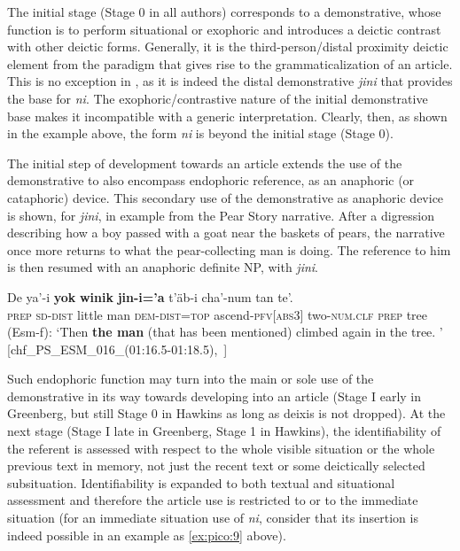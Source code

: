 \documentclass[output=paper
,modfonts
,nonflat]{langsci/langscibook}
\begin{document}
The initial stage (Stage 0 in all authors) corresponds to a demonstrative, whose function is to perform situational or exophoric  and introduces a deictic contrast with other deictic forms. Generally, it is the third-person/distal proximity deictic element from the paradigm that gives rise to the grammaticalization of an article. This is no exception in , as it is indeed the distal demonstrative \textit{jini} that provides the base for \textit{ni}.
The exophoric/contrastive nature of the initial demonstrative base makes it incompatible with a generic interpretation. Clearly, then, as shown in the example  above, the form \textit{ni} is beyond the initial stage (Stage 0).

The initial step of development towards an article extends the use of the demonstrative to also encompass endophoric reference, as an anaphoric (or cataphoric) device.  
This secondary use of the demonstrative as anaphoric device is shown, for  \textit{jini}, in example  from the Pear Story narrative. After a digression describing how a boy passed with a goat near the baskets of pears, the narrative once more returns to what the pear-collecting man is doing. The reference to him is then resumed with an anaphoric definite NP, with \textit{jini}.  

\ea  \label{ex:pico:55}

\gll De ya'-i \textbf{yok} \textbf{winik} \textbf{jin-i='a} t'äb-i cha'-num tan te'.\\
\textsc{prep} \textsc{sd}-\textsc{dist} {little} {man} \textsc{dem}-\textsc{dist}=\textsc{top} {ascend}-\textsc{pfv[abs3]} two-\textsc{num.clf} \textsc{prep} tree \\
\glt (Esm-f): `Then \textbf{the man} (that has been mentioned) climbed again in the tree. ' [chf\_PS\_ESM\_016\_(01:16.5-01:18.5),~\citealt{Delgado-Galvan2018archive}]

\z 

Such endophoric function may turn into the main or sole use of the demonstrative in its way towards developing into an article (Stage I early in Greenberg, but still Stage 0 in Hawkins as long as deixis is not dropped).
At the next stage (Stage I late in Greenberg, Stage 1 in Hawkins), the identifiability of the referent is assessed with respect to the whole visible situation or the whole previous text in memory, not just the recent text or some deictically selected subsituation. Identifiability is expanded to both textual and situational assessment and therefore the article use is restricted to  or to the immediate situation (for an immediate situation use of \textit{ni}, consider that its insertion is indeed possible in an example as \ref{ex:pico:9} above). 
\end{document}
